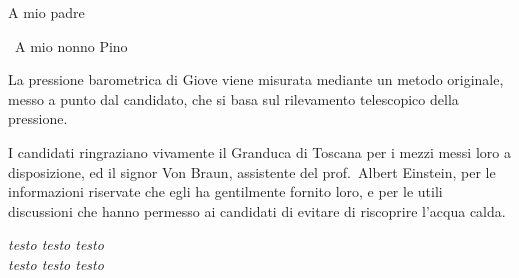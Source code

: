 \documentclass[%
    corpo=11pt,
    twoside,
    oldstyle,
    tipotesi=magistrale,
    greek,
    evenboxes,
]{toptesi}
\begin{document}
\ifclassica%
{\begin{dedica}
    A mio padre

    \textdagger\ A mio nonno Pino
\end{dedica}
\fi

\english
\begin{abstract}
This short abstract, is typeset with the \texttt{abstract} environment (from the \texttt{report} document class) just to test if it works. or what concerns working, it works, but in Italian ist title turns out to be ``Sommario'' in bold face series and normal size; its apperance looks like  a bad copy of what one obtains with the \texttt{\string\summary} command. In English, though, its title is “Abstract”, as it should be, since at the beginning of this template a suitable \texttt{\string\ExtendCapions} command was issued.

Please, read the documentation  in Italian (file \texttt{toptesi-it.pdf} in order to fully understand the difference beteesn “abstract” and “summary” in the context of this bundle.

\end{abstract}

\italiano
\sommario

La pressione barometrica di Giove viene misurata
mediante un metodo originale,  messo a punto dal candidato, che si basa
sul rilevamento telescopico della pressione.

\italiano

\ringraziamenti

I candidati ringraziano vivamente il Granduca di Toscana per i mezzi
messi loro a disposizione, ed il signor Von Braun, assistente del
prof.~Albert Einstein, per le informazioni riservate che egli ha
gentilmente fornito loro, e per le utili discussioni che hanno permesso
ai candidati di evitare di riscoprire l'acqua calda.

\tablespagetrue\figurespagetrue %
\indici

\ifclassica   
\begin{citazioni}
    \textit{testo testo testo\\testo testo testo}


\end{citazioni}}
\end{document}
